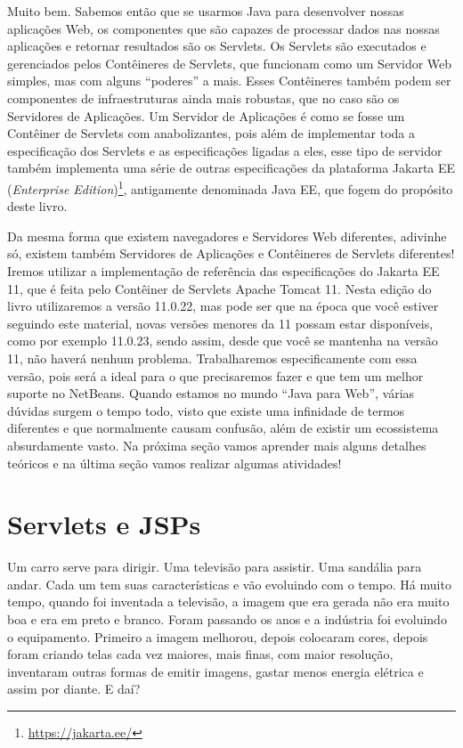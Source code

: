 Muito bem. Sabemos então que se usarmos Java para desenvolver nossas aplicações Web, os componentes que são capazes de processar dados nas nossas aplicações e retornar resultados são os Servlets. Os Servlets são executados e gerenciados pelos Contêineres de Servlets, que funcionam como um Servidor Web simples, mas com alguns ``poderes'' a mais. Esses Contêineres também podem ser componentes de infraestruturas ainda mais robustas, que no caso são os Servidores de Aplicações. Um Servidor de Aplicações é como se fosse um Contêiner de Servlets com anabolizantes, pois além de implementar toda a especificação dos Servlets e as especificações ligadas a eles, esse tipo de servidor também implementa uma série de outras especificações da plataforma Jakarta EE (\textit{Enterprise Edition})\footnote{\url{https://jakarta.ee/}}, antigamente denominada Java EE, que fogem do propósito deste livro.

Da mesma forma que existem navegadores e Servidores Web diferentes, adivinhe só, existem também Servidores de Aplicações e Contêineres de Servlets diferentes! Iremos utilizar a implementação de referência das especificações do Jakarta EE 11, que é feita pelo Contêiner de Servlets Apache Tomcat 11. Nesta edição do livro utilizaremos a versão 11.0.22, mas pode ser que na época que você estiver seguindo este material, novas versões menores da 11 possam estar disponíveis, como por exemplo 11.0.23, sendo assim, desde que você se mantenha na versão 11, não haverá nenhum problema. Trabalharemos especificamente com essa versão, pois será a ideal para o que precisaremos fazer e que tem um melhor suporte no NetBeans. Quando estamos no mundo ``Java para Web'', várias dúvidas surgem o tempo todo, visto que existe uma infinidade de termos diferentes e que normalmente causam confusão, além de existir um ecossistema absurdamente vasto. Na próxima seção vamos aprender mais alguns detalhes teóricos e na última seção vamos realizar algumas atividades!


\section{Servlets e JSPs}

Um carro serve para dirigir. Uma televisão para assistir. Uma sandália para andar. Cada um tem suas características e vão evoluindo com o tempo. Há muito tempo, quando foi inventada a televisão, a imagem que era gerada não era muito boa e era em preto e branco. Foram passando os anos e a indústria foi evoluindo o equipamento. Primeiro a imagem melhorou, depois colocaram cores, depois foram criando telas cada vez maiores, mais finas, com maior resolução, inventaram outras formas de emitir imagens, gastar menos energia elétrica e assim por diante. E daí?

